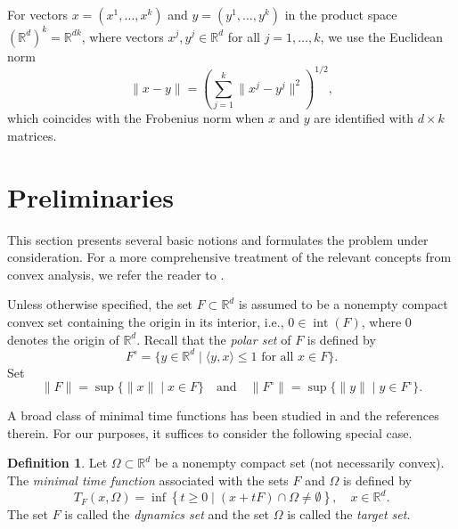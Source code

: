 \documentclass[sn-mathphys-num]{sn-jnl}%
\theoremstyle{definition}
\newtheorem{definition}[theorem]{Definition}
\begin{document}
For vectors $x=(x^1,\dots,x^k)$ and $y=(y^1,\dots,y^k)$ in the product space $(\mathbb{R}^d)^k=\mathbb{R}^{dk}$, where vectors $x^j,y^j\in\mathbb{R}^d$ for all $j=1,\dots,k$, we use the Euclidean norm
\[
\|x-y\|=\left(\sum_{j=1}^k \|x^j-y^j\|^2\right)^{1/2},
\]
which coincides with the Frobenius norm when $x$ and $y$ are identified with $d\times k$ matrices.




\section{Preliminaries} \label{pre}

This section presents several basic notions and formulates the problem under consideration. For a more comprehensive treatment of the relevant concepts from convex analysis, we refer the reader to \cite{Bauschke,mordukhovich2023easy}.

Unless otherwise specified, the set $F \subset \mathbb{R}^d$ is assumed to be a nonempty compact convex set containing the origin in its interior, i.e., $0 \in \operatorname{int}(F)$, where $0$ denotes the origin of $\mathbb{R}^d$. 
Recall that the \emph{polar set} of $F$ is defined by
\[
F^\circ = \{y \in \mathbb{R}^d \mid \langle y,x\rangle \le 1 \text{ for all } x \in F\}.\]
Set
\[
\|F\| = \sup\{\|x\| \mid x \in F\}\quad\text{and}\quad 
\|F^\circ\| = \sup\{\|y\| \mid y \in F^\circ\}.
\]

A broad class of minimal time functions has been studied in  \cite{	colombo2004subgradient,colombo2010well,durea2016minimal,he2006subdifferentials,jiang2012subdifferential,mordukhovich2010limiting,mordukhovich2011subgradients,wolenski1998proximal} and the references therein. For our purposes, it suffices to consider the following special case.

\begin{definition}
	\label{T_definition}
	Let $\Omega \subset \mathbb{R}^d$ be a nonempty
	compact set (not necessarily convex). The \emph{minimal time function} associated with the sets $F$ and $\Omega$ is defined by
	\begin{equation}
		\label{minimaltime}
		T_F(x,\Omega) = \inf \left\{ t \geq 0 \mid (x + tF) \cap \Omega \neq \emptyset \right\}, \quad x \in \mathbb{R}^d.
	\end{equation}
	The set $F$ is called the \textit{dynamics set} and the set $\Omega$ is called the \textit{target set}.
\end{definition}
\end{document}
